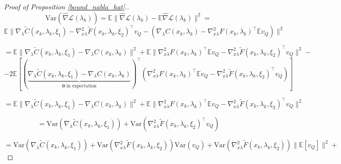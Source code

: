\documentclass[11pt, twoside]{report}
\begin{document}
\begin{proof}[Proof of Proposition \ref{bound_nabla_hat}.]
    \[\mathrm{Var}(\widehat{\nabla}\mathcal{L}(\lambda_k)) =  \mathbb{E}\|\widehat{\nabla}\mathcal{L}(\lambda_k) - \mathbb{E}\widehat{\nabla}\mathcal{L}(\lambda_k)\|^2 = \]
\[\mathbb{E}\| \nabla_\lambda \tilde{C}(x_k,\lambda_k,\xi_1) - \nabla_{x \lambda}^2 \tilde{F}(x_k,\lambda_k,\xi_2)^\top v_Q - \left(\nabla_\lambda C (x_k,\lambda_k) - \nabla_{x \lambda}^2 F (x_k,\lambda_k)^\top \mathbb{E} v_Q \right)\|^2\]

\[= \mathbb{E}\|\nabla_\lambda \tilde{C}(x_k,\lambda_k,\xi_1) - \nabla_\lambda C (x_k,\lambda_k)\|^2 + \mathbb{E}\|\nabla_{x \lambda}^2 F (x_k,\lambda_k)^\top \mathbb{E} v_Q - \nabla_{x \lambda}^2 \tilde{F}(x_k,\lambda_k,\xi_2)^\top v_Q\|^2 - \]
\[- 2\mathbb{E}\left[\left(\underbrace{\nabla_\lambda \tilde{C}(x_k,\lambda_k,\xi_1) - \nabla_\lambda C (x_k,\lambda_k)}_{\mathbf{0} \text{ in expectation}}\right)^\top \left(\nabla_{x \lambda}^2 F (x_k,\lambda_k)^\top \mathbb{E} v_Q - \nabla_{x \lambda}^2 \tilde{F}(x_k,\lambda_k,\xi_2)^\top v_Q\right) \right]\]

\[= \mathbb{E}\|\nabla_\lambda \tilde{C}(x_k,\lambda_k,\xi_1) - \nabla_\lambda C (x_k,\lambda_k)\|^2 + \mathbb{E}\|\nabla_{x \lambda}^2 F (x_k,\lambda_k)^\top \mathbb{E} v_Q - \nabla_{x \lambda}^2 \tilde{F}(x_k,\lambda_k,\xi_2)^\top v_Q\|^2\]

\begin{equation} \label{ind_var_nabhatprop}
    =\mathrm{Var}\left(\nabla_\lambda \tilde{C}(x_k,\lambda_k,\xi_1) \right) + \mathrm{Var}\left(\nabla_{x \lambda}^2 \tilde{F}(x_k,\lambda_k,\xi_2)^\top v_Q \right)
\end{equation}

\[=\mathrm{Var}\left(\nabla_\lambda \tilde{C}(x_k,\lambda_k,\xi_1) \right) + \mathrm{Var}\left(\nabla_{x \lambda}^2 \tilde{F}(x_k,\lambda_k,\xi_2) \right) \mathrm{Var} \left(v_Q \right) + \mathrm{Var}\left(\nabla_{x \lambda}^2 \tilde{F}(x_k,\lambda_k,\xi_2) \right) \|\mathbb{E}[v_Q]\|^2 +  \]


\end{proof}
\end{document}
